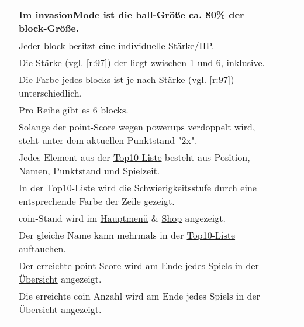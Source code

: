 \begin{xltabular}{\textwidth}{|l|X|r|r|}
    \setSystem{\ref*{sys:inv}}   %

      & \OPT{*} Im \gls{invasionMode} ist die \gls{ball}-Größe ca. 80\% der \gls{block}-Größe.            &      &      \\ \hline
      & \OPT{*} Jeder \gls{block} besitzt eine individuelle Stärke/HP.    &      &      \\ \hline
      & \OPT{*} Die Stärke (vgl. \ref{r:97}) der liegt zwischen 1 und 6, inklusive.    &      &      \\ \hline
      & \OPT{*} Die Farbe jedes \glspl{block} ist je nach Stärke (vgl. \ref{r:97}) unterschiedlich.    &      &      \\ \hline
     & \OPT{*} Pro Reihe gibt es 6 \glspl{block}.    &      &      \\ \hline

    \setSystem{\ref*{sys:scs}}   %

      & Solange der \gls{point}-Score wegen \glspl{powerup} verdoppelt wird, steht unter dem aktuellen Punktstand "2x".              &      &      \\ \hline
      & Jedes Element aus der \hyperref[fig:dia:top10]{Top10-Liste} besteht aus Position, Namen, Punktstand und Spielzeit.         &      &      \\ \hline
      & In der \hyperref[fig:dia:top10]{Top10-Liste} wird die Schwierigkeitsstufe durch eine entsprechende Farbe der Zeile gezeigt. &      &     \\ \hline
     &  \gls{coin}-Stand wird im \hyperref[fig:dia:mainMenu]{Hauptmenü} \& \hyperref[fig:dia:skins]{Shop} angezeigt.            &      &      \\ \hline
     &  Der gleiche Name kann mehrmals in der \hyperref[fig:dia:top10]{Top10-Liste} auftauchen.             &      &      \\ \hline
     &  Der erreichte \gls{point}-Score wird am Ende jedes Spiels in der \hyperref[fig:dia:gameOver]{Übersicht} angezeigt.            &      &      \\ \hline
     &  Die erreichte \gls{coin} Anzahl wird am Ende jedes Spiels in der \hyperref[fig:dia:gameOver]{Übersicht} angezeigt.            &      &      \\ \hline

    \setSystem{\ref*{sys:cur}}   %


\end{xltabular}

